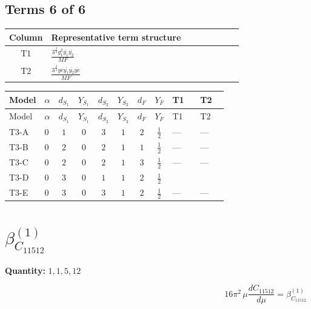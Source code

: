 \documentclass[8pt]{article}
\begin{document}
\begin{landscape}
\subsection*{Terms 6 of 6}
\begin{center}
\begin{tabular}{@{}c >{\raggedright\arraybackslash}p{0.82\linewidth}@{}}
\toprule
Column & Representative term structure \\
\midrule
T1 & \(\displaystyle \frac{3^{\frac{3}{4}} g_{1}^{2} \overline{y_{1}} \overline{y_{2}}}{MF}\) \\
\midrule
T2 & \(\displaystyle \frac{3^{\frac{3}{4}} ye \overline{y_{1}} \overline{y_{2}} \overline{ye}}{MF}\) \\
\midrule
\bottomrule
\end{tabular}
\end{center}
\smallskip
\tiny
\begin{longtable}{@{}llcccccc >{\raggedright\arraybackslash}p{0.21\linewidth} >{\raggedright\arraybackslash}p{0.21\linewidth}@{}}
\toprule
Model & $\alpha$ & $d_{S_1}$ & $Y_{S_1}$ & $d_{S_2}$ & $Y_{S_2}$ & $d_F$ & $Y_F$ & T1 & T2 \\
\midrule
\endfirsthead
\toprule
Model & $\alpha$ & $d_{S_1}$ & $Y_{S_1}$ & $d_{S_2}$ & $Y_{S_2}$ & $d_F$ & $Y_F$ & T1 & T2 \\
\midrule
\endhead
T3-A & $0$ & $1$ & $0$ & $3$ & $1$ & $2$ & $\frac{1}{2}$ & --- & --- \\
\midrule
T3-B & $0$ & $2$ & $0$ & $2$ & $1$ & $1$ & $\frac{1}{2}$ & --- & --- \\
\midrule
T3-C & $0$ & $2$ & $0$ & $2$ & $1$ & $3$ & $\frac{1}{2}$ & --- & --- \\
\midrule
T3-D & $0$ & $3$ & $0$ & $1$ & $1$ & $2$ & $\frac{1}{2}$ & \scriptsize\adjustbox{max width=\linewidth}{$\begin{gathered} - \frac{3^{\frac{3}{4}} g_{1}^{2} \overline{y_{1}} \overline{y_{2}}}{8 MF}\end{gathered}$} & \scriptsize\adjustbox{max width=\linewidth}{$\begin{gathered} \frac{3^{\frac{3}{4}} ye \overline{y_{1}} \overline{y_{2}} \overline{ye}}{12 MF}\end{gathered}$} \\
\midrule
T3-E & $0$ & $3$ & $0$ & $3$ & $1$ & $2$ & $\frac{1}{2}$ & --- & --- \\
\midrule
\bottomrule
\end{longtable}
\clearpage
\section*{$\beta_{C_{11512}}^{(1)}$}
\noindent\textbf{Quantity: }$\mathrm{1,1,5,12}$\par\smallskip
\[16\pi^2\,\mu\frac{d C_{11512}}{d\mu}=\beta_{C_{11512}}^{(1)}\]

\end{landscape}
\end{document}
